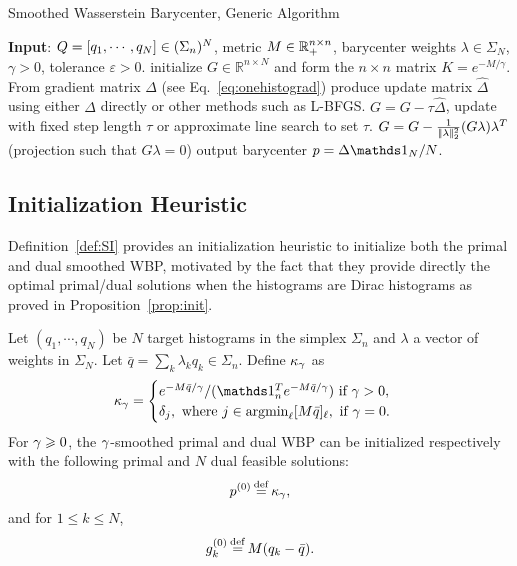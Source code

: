 \begin{algorithm}
	\begin{algorithmic}[1]
		\caption{Smoothed Wasserstein Barycenter, Generic Algorithm\label{algo:firstorder}}
		\STATE \textbf{Input}: $Q=[q_1,\cdots,q_N] \in(\Sigma_n)^N$, metric $M\in\mathbb{R}_+^{n\times n}$, barycenter weights $\lambda\in\Sigma_N$, $\gamma>0$, tolerance $\varepsilon>0$. 
		\STATE initialize $G\in\mathbb{R}^{n\times N}$ and form the $n\times n$ matrix $K=e^{-M/\gamma }$.
		\REPEAT
				\STATE From gradient matrix $\Delta$ (see Eq.~\ref{eq:onehistograd}) produce update matrix $\hat{\Delta}$ using either $\Delta$ directly or other methods such as L-BFGS.
				\STATE $G= G - \tau \hat{\Delta}$, update with fixed step length $\tau$ or approximate line search to set $\tau$.
				\STATE $G = G - \frac{1}{|\!| \lambda |\!|_2^2}(G \lambda)  \lambda^T$ \quad (projection such that $G\lambda=0$)
		\STATE output barycenter $\p=\Delta \ones_N/N$.
	\end{algorithmic}
\end{algorithm}

\subsection{Initialization Heuristic}
\label{sec:magictrick}

\def\abstildek{\abs{\kappa}}
Definition~\ref{def:SI} provides an initialization heuristic to initialize both the primal and dual smoothed WBP, motivated by the fact that they provide directly the optimal primal/dual solutions when the histograms are Dirac histograms as proved in Proposition~\ref{prop:init}.

\begin{definition}\label{def:SI}
Let $(q_1,\cdots,q_N)$ be $N$ target histograms in the simplex $\Sigma_n$ and $\lambda$ a vector of weights in $\Sigma_N$. Let  $\bar{q}=\sum_k \lambda_k q_k\in\Sigma_n$. Define $\kappa_\gamma$ as
$$\kappa_\gamma = \begin{cases} e^{-M\bar{q}/\ga}/(\ones_\n^Te^{-M\bar{q}/\ga}) \text{ if } \ga>0,\\  
\delta_j, \text{ where } j\in\argmin_\ell [M\bar{q}]_\ell, \text{ if } \gamma=0.\end{cases}$$ 
For $\gamma\geqslant 0$, the $\gamma$-smoothed primal and dual WBP can be initialized respectively with the following primal and $N$ dual feasible solutions:
\begin{equation}\label{eq:sinkprimalinit}
	\p^{(0)}\defeq \kappa_\ga,
\end{equation}
and for $1 \leq k \leq N$,
\begin{equation}\label{eq:sinkdualinit}
g_k^{(0)} \defeq M (q_k - \bar{q}).
\end{equation}
\end{definition}

